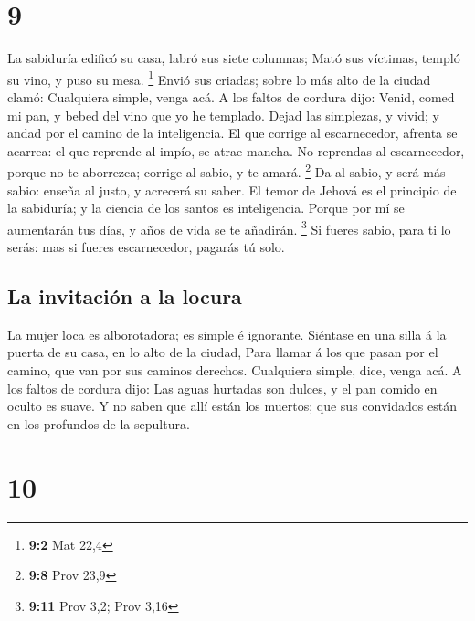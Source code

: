\hypertarget{section-8}{%
\section{9}\label{section-8}}

 La sabiduría edificó su casa, labró sus siete columnas;
 Mató sus víctimas, templó su vino, y puso su mesa.
\footnote{\textbf{9:2} Mat 22,4}  Envió sus criadas; sobre
lo más alto de la ciudad clamó:  Cualquiera simple, venga
acá. A los faltos de cordura dijo:  Venid, comed mi pan, y
bebed del vino que yo he templado.  Dejad las simplezas, y
vivid; y andad por el camino de la inteligencia.  El que
corrige al escarnecedor, afrenta se acarrea: el que reprende al impío,
se atrae mancha.  No reprendas al escarnecedor, porque no te
aborrezca; corrige al sabio, y te amará. \footnote{\textbf{9:8} Prov
  23,9}  Da al sabio, y será más sabio: enseña al justo, y
acrecerá su saber.  El temor de Jehová es el principio de
la sabiduría; y la ciencia de los santos es inteligencia. 
Porque por mí se aumentarán tus días, y años de vida se te añadirán.
\footnote{\textbf{9:11} Prov 3,2; Prov 3,16}  Si fueres
sabio, para ti lo serás: mas si fueres escarnecedor, pagarás tú solo.

\hypertarget{la-invitaciuxf3n-a-la-locura}{%
\subsection{La invitación a la
locura}\label{la-invitaciuxf3n-a-la-locura}}

 La mujer loca es alborotadora; es simple é ignorante.
 Siéntase en una silla á la puerta de su casa, en lo alto
de la ciudad,  Para llamar á los que pasan por el camino,
que van por sus caminos derechos.  Cualquiera simple, dice,
venga acá. A los faltos de cordura dijo:  Las aguas
hurtadas son dulces, y el pan comido en oculto es suave.  Y
no saben que allí están los muertos; que sus convidados están en los
profundos de la sepultura.

\hypertarget{section-9}{%
\section{10}\label{section-9}}

